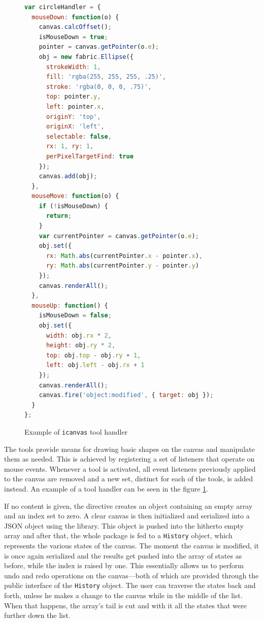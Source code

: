 \documentclass[thesis=M,english,hidelinks]{FITthesis}[2012/10/20]
\newcommand{\code}{\texttt}
\begin{document}
\begin{figure}
  \begin{lstlisting}[language=JavaScript]
var circleHandler = {
  mouseDown: function(o) {
    canvas.calcOffset();
    isMouseDown = true;
    pointer = canvas.getPointer(o.e);
    obj = new fabric.Ellipse({
      strokeWidth: 1,
      fill: 'rgba(255, 255, 255, .25)',
      stroke: 'rgba(0, 0, 0, .75)',
      top: pointer.y,
      left: pointer.x,
      originY: 'top',
      originX: 'left',
      selectable: false,
      rx: 1, ry: 1,
      perPixelTargetFind: true
    });
    canvas.add(obj);
  },
  mouseMove: function(o) {
    if (!isMouseDown) {
      return;
    }
    var currentPointer = canvas.getPointer(o.e);
    obj.set({
      rx: Math.abs(currentPointer.x - pointer.x),
      ry: Math.abs(currentPointer.y - pointer.y)
    });
    canvas.renderAll();
  },
  mouseUp: function() {
    isMouseDown = false;
    obj.set({
      width: obj.rx * 2,
      height: obj.ry * 2,
      top: obj.top - obj.ry + 1,
      left: obj.left - obj.rx + 1
    });
    canvas.renderAll();
    canvas.fire('object:modified', { target: obj });
  }
};
  \end{lstlisting}
  \caption{Example of \code{icanvas} tool handler}
  \label{fig:tool_handler}
\end{figure}

The tools provide means for drawing basic shapes on the canvas and manipulate them as needed. This is achieved by registering a set of listeners that operate on mouse events. Whenever a tool is activated, all event listeners previously applied to the canvas are removed and a new set, distinct for each of the tools, is added instead. An example of a tool handler can be seen in the figure \ref{fig:tool_handler}.

If no content is given, the directive creates an object containing an empty array and an index set to zero. A clear canvas is then initialized and serialized into a JSON object using the library. This object is pushed into the hitherto empty array and after that, the whole package is fed to a \code{History} object, which represents the various states of the canvas. The moment the canvas is modified, it is once again serialized and the results get pushed into the array of states as before, while the index is raised by one. This essentially allows us to perform undo and redo operations on the canvas---both of which are provided through the public interface of the \code{History} object. The user can traverse the states back and forth, unless he makes a change to the canvas while in the middle of the list. When that happens, the array's tail is cut and with it all the states that were further down the list.
\end{document}
